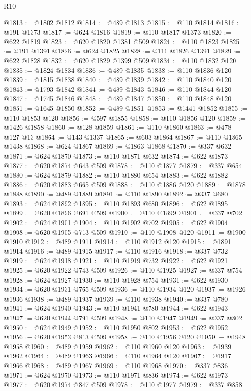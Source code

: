 \begin{lexlean}{R10}
\begin{coremodule}
@1813 := @1802 @1812
@1814 := @489 @1813
@1815 := @110 @1814
@1816 := @191 @1373
@1817 := @624 @1816
@1819 := @110 @1817 @1373
@1820 := @622 @1819
@1823 := @620 @1820 @1381 @509
@1824 := @110 @1823
@1825 := @191 @1391
@1826 := @624 @1825
@1828 := @110 @1826 @1391
@1829 := @622 @1828
@1832 := @620 @1829 @1399 @509
@1834 := @110 @1832 @120
@1835 := @1824 @1834
@1836 := @489 @1835
@1838 := @110 @1836 @120
@1839 := @1815 @1838
@1840 := @489 @1839
@1842 := @110 @1840 @120
@1843 := @1793 @1842
@1844 := @489 @1843
@1846 := @110 @1844 @120
@1847 := @1745 @1846
@1848 := @489 @1847
@1850 := @110 @1848 @120
@1851 := @1645 @1850
@1852 := @489 @1851
@1853 := @1441 @1852
@1855 := @110 @1853 @120
@1856 := @597 @1855
@1858 := @110 @1856 @120
@1859 := @1426 @1858
@1860 := @128 @1859
@1861 := @110 @1860
@1863 := @478 @127 @13
@1864 := @143 @1337
@1865 := @603 @1864
@1867 := @110 @1865 @1438
@1868 := @624 @1867
@1869 := @1863 @1868
@1870 := @337 @632
@1871 := @624 @1870
@1873 := @110 @1871 @632
@1874 := @622 @1873
@1877 := @620 @1874 @643 @509
@1878 := @110 @1877
@1879 := @337 @654
@1880 := @624 @1879
@1882 := @110 @1880 @654
@1883 := @622 @1882
@1886 := @620 @1883 @665 @509
@1888 := @110 @1886 @120
@1889 := @1878 @1888
@1890 := @489 @1889
@1891 := @110 @1890
@1892 := @337 @680
@1893 := @624 @1892
@1895 := @110 @1893 @680
@1896 := @622 @1895
@1899 := @620 @1896 @691 @509
@1900 := @110 @1899
@1901 := @337 @702
@1902 := @624 @1901
@1904 := @110 @1902 @702
@1905 := @622 @1904
@1908 := @620 @1905 @713 @509
@1910 := @110 @1908 @120
@1911 := @1900 @1910
@1912 := @489 @1911
@1914 := @110 @1912 @120
@1915 := @1891 @1914
@1916 := @489 @1915
@1917 := @110 @1916
@1918 := @337 @732
@1919 := @624 @1918
@1921 := @110 @1919 @732
@1922 := @622 @1921
@1925 := @620 @1922 @743 @509
@1926 := @110 @1925
@1927 := @337 @754
@1928 := @624 @1927
@1930 := @110 @1928 @754
@1931 := @622 @1930
@1934 := @620 @1931 @765 @509
@1936 := @110 @1934 @120
@1937 := @1926 @1936
@1938 := @489 @1937
@1939 := @110 @1938
@1940 := @337 @780
@1941 := @624 @1940
@1943 := @110 @1941 @780
@1944 := @622 @1943
@1947 := @620 @1944 @791 @509
@1948 := @110 @1947
@1949 := @337 @802
@1950 := @624 @1949
@1952 := @110 @1950 @802
@1953 := @622 @1952
@1956 := @620 @1953 @813 @509
@1958 := @110 @1956 @120
@1959 := @1948 @1958
@1960 := @489 @1959
@1962 := @110 @1960 @120
@1963 := @1939 @1962
@1964 := @489 @1963
@1966 := @110 @1964 @120
@1967 := @1917 @1966
@1968 := @489 @1967
@1969 := @110 @1968
@1970 := @337 @836
@1971 := @624 @1970
@1973 := @110 @1971 @836
@1974 := @622 @1973
@1977 := @620 @1974 @847 @509
@1978 := @110 @1977
@1979 := @337 @858

\end{coremodule}
\end{lexlean}
